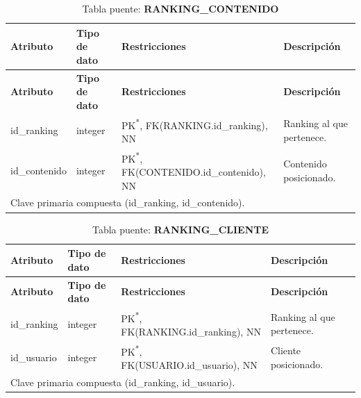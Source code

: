\begin{longtable}{|l|l|p{5cm}|p{5cm}|}
\caption{Tabla puente: \textbf{RANKING\_CONTENIDO}}\\ \hline
\textbf{Atributo} & \textbf{Tipo de dato} & \textbf{Restricciones} & \textbf{Descripción} \\ \hline
\endfirsthead
\hline \textbf{Atributo} & \textbf{Tipo de dato} & \textbf{Restricciones} & \textbf{Descripción} \\ \hline
\endhead
id\_ranking   & integer & PK\textsuperscript{*}, FK(RANKING.id\_ranking), NN & Ranking al que pertenece. \\ \hline
id\_contenido & integer & PK\textsuperscript{*}, FK(CONTENIDO.id\_contenido), NN & Contenido posicionado. \\ \hline
\multicolumn{4}{l}{\footnotesize * Clave primaria compuesta (id\_ranking, id\_contenido).} \\
\end{longtable}

\begin{longtable}{|l|l|p{5cm}|p{5cm}|}
\caption{Tabla puente: \textbf{RANKING\_CLIENTE}}\\ \hline
\textbf{Atributo} & \textbf{Tipo de dato} & \textbf{Restricciones} & \textbf{Descripción} \\ \hline
\endfirsthead
\hline \textbf{Atributo} & \textbf{Tipo de dato} & \textbf{Restricciones} & \textbf{Descripción} \\ \hline
\endhead
id\_ranking & integer & PK\textsuperscript{*}, FK(RANKING.id\_ranking), NN & Ranking al que pertenece. \\ \hline
id\_usuario & integer & PK\textsuperscript{*}, FK(USUARIO.id\_usuario), NN & Cliente posicionado. \\ \hline
\multicolumn{4}{l}{\footnotesize * Clave primaria compuesta (id\_ranking, id\_usuario).} \\
\end{longtable}